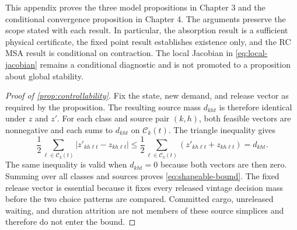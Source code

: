 \documentclass[a4paper,fleqn]{cas-sc}
\begin{document}
This appendix proves the three model propositions in Chapter 3 and the
conditional convergence proposition in Chapter 4. The arguments preserve the
scope stated with each result. In particular, the absorption result is a
sufficient physical certificate, the fixed point result establishes existence
only, and the RC MSA result is conditional on contraction. The local Jacobian
in \cref{eq:local-jacobian} remains a conditional diagnostic and is not promoted
to a proposition about global stability.

\begin{proof}[Proof of \cref{prop:controllability}]
Fix the state, new demand, and release vector as required by the proposition.
The resulting source mass $d_{kht}$ is therefore identical under $z$ and
$z'$. For each class and source pair $(k,h)$, both feasible vectors are
nonnegative and each sums to $d_{kht}$ on $\mathcal C_k(t)$. The triangle
inequality gives
\[
 \frac12\sum_{\ell\in\mathcal C_k(t)}
 |z'_{kh\ell t}-z_{kh\ell t}|
 \le
 \frac12\sum_{\ell\in\mathcal C_k(t)}
 \left(z'_{kh\ell t}+z_{kh\ell t}\right)
 =d_{kht}.
\]
The same inequality is valid when $d_{kht}=0$ because both vectors are then
zero. Summing over all classes and sources proves
\cref{eq:shapeable-bound}. The fixed release vector is essential because it
fixes every released vintage decision mass before the two choice patterns are
compared. Committed cargo, unreleased waiting, and duration attrition are not
members of these source simplices and therefore do not enter the bound.
\end{proof}
\end{document}
